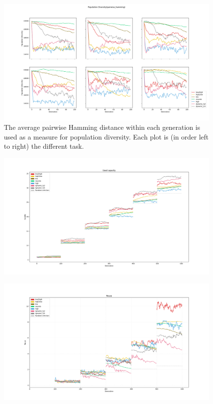 \begin{figure}[h]
    \includegraphics[width=\textwidth]{Chapters/Experiments/search_algo/figures/Average_population_diversity_pairwise_hamming.png}
    \caption{The average pairwise Hamming distance within each generation is used as a measure for population diversity. Each plot is (in order left to right) the different task.}
    \label{fig:search.diversity}
\end{figure}

\begin{figure}[h]
    \includegraphics[width=\textwidth]{Chapters/Experiments/search_algo/figures/Capacity_pr_generation.png}
    \caption{}
    \label{fig:search.capacity}
\end{figure}

\begin{figure}[h]
    \includegraphics[width=\textwidth]{Chapters/Experiments/search_algo/figures/Module_reuse_pr_generation.png}
    \caption{}
    \label{fig:search.reuse}
\end{figure}

